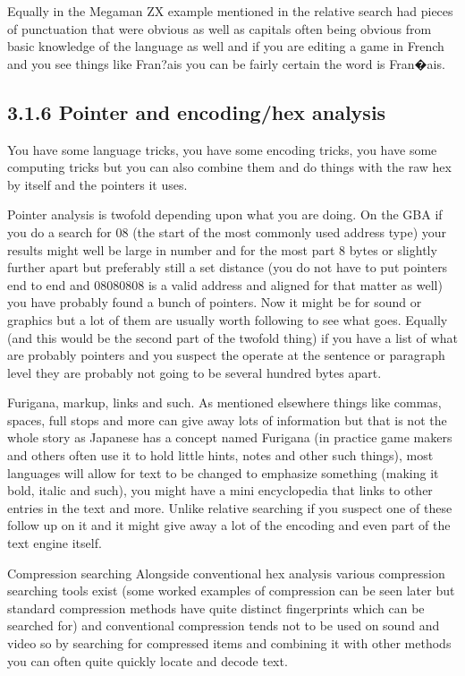 \documentclass[
]{book}
\begin{document}
Equally in the Megaman ZX example mentioned in the relative search had pieces of punctuation that were obvious as well as capitals often being obvious from basic knowledge of the language as well and if you are editing a game in French and you see things like Fran?ais you can be fairly certain the word is Fran�ais.

\hypertarget{pointer-and-encodinghex-analysis}{%
\subsection{3.1.6 Pointer and encoding/hex analysis}\label{pointer-and-encodinghex-analysis}}

You have some language tricks, you have some encoding tricks, you have some computing tricks but you can also combine them and do things with the raw hex by itself and the pointers it uses.

Pointer analysis is twofold depending upon what you are doing. On the GBA if you do a search for 08 (the start of the most commonly used address type) your results might well be large in number and for the most part 8 bytes or slightly further apart but preferably still a set distance (you do not have to put pointers end to end and 08080808 is a valid address and aligned for that matter as well) you have probably found a bunch of pointers. Now it might be for sound or graphics but a lot of them are usually worth following to see what goes. Equally (and this would be the second part of the twofold thing) if you have a list of what are probably pointers and you suspect the operate at the sentence or paragraph level they are probably not going to be several hundred bytes apart.

Furigana, markup, links and such. As mentioned elsewhere things like commas, spaces, full stops and more can give away lots of information but that is not the whole story as Japanese has a concept named Furigana (in practice game makers and others often use it to hold little hints, notes and other such things), most languages will allow for text to be changed to emphasize something (making it bold, italic and such), you might have a mini encyclopedia that links to other entries in the text and more. Unlike relative searching if you suspect one of these follow up on it and it might give away a lot of the encoding and even part of the text engine itself.

Compression searching Alongside conventional hex analysis various compression searching tools exist (some worked examples of compression can be seen later but standard compression methods have quite distinct fingerprints which can be searched for) and conventional compression tends not to be used on sound and video so by searching for compressed items and combining it with other methods you can often quite quickly locate and decode text.
\end{document}
